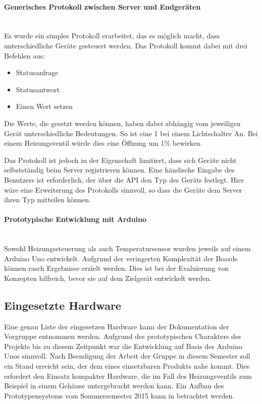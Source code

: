 \paragraph{Generisches Protokoll zwischen Server und Endgeräten}\mbox{}\\
Es wurde ein simples Protokoll erarbeitet, das es möglich macht, dass unterschiedliche Geräte gesteuert werden. Das Protokoll kommt dabei mit drei Befehlen aus:
\begin{itemize}
\item Statusanfrage
\item Statusantwort
\item Einen Wert setzen
\end{itemize}

Die Werte, die gesetzt werden können, haben dabei abhängig vom jeweiligen Gerät unterschiedliche Bedeutungen. So ist eine 1 bei einem Lichtschalter An. Bei einem Heizungsventil würde dies eine Öffnung um 1\% bewirken.

Das Protokoll ist jedoch in der Eigenschaft limitiert, dass sich Geräte nicht selbstständig beim Server registrieren können. Eine händische Eingabe des Benutzers ist erforderlich, der über die API den Typ des Geräts festlegt. Hier wäre eine Erweiterung des Protokolls sinnvoll, so dass die Geräte dem Server ihren Typ mitteilen können.

\paragraph{Prototypische Entwicklung mit Arduino}\mbox{}\\
Sowohl Heizungssteuerung als auch Temperatursensor wurden jeweils auf einem Arduino Uno entwickelt. Aufgrund der veringerten Komplexität der Boards können rasch Ergebnisse erzielt werden. Dies ist bei der Evaluierung von Konzepten hilfreich, bevor sie auf dem Zielgerät entwickelt werden.

\subsection{Eingesetzte Hardware}
Eine genau Liste der eingesetzen Hardware kann der Dokumentation der Vorgruppe entnommen werden. Aufgrund des prototypischen Charakters des Projekts bis zu diesem Zeitpunkt war die Entwicklung auf Basis des Arduino Unos sinnvoll. Nach Beendigung der Arbeit der Gruppe in diesem Semester soll ein Stand erreicht sein, der dem eines einsetzbaren Produkts nahe kommt. Dies erfordert den Einsatz kompakter Hardware, die im Fall des Heizungsventils zum Beispiel in einem Gehäuse untergebracht werden kann.
Ein Aufbau des Prototypensystems vom Sommersemester 2015 kann in  betrachtet werden.

